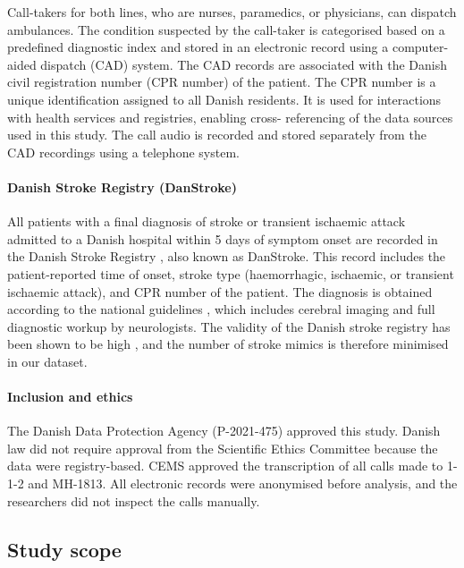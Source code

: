 {Call-takers for both lines, who are nurses, paramedics, or physicians, can dispatch ambulances. The condition suspected by the call-taker is categorised based on a predefined diagnostic index and stored in an electronic record using a computer-aided dispatch (CAD) system. The CAD records are associated with the Danish civil registration number (CPR number) \parencite{cite19} of the patient. The CPR number is a unique identification assigned to all Danish residents. It is used for interactions with health services and registries, enabling cross- referencing of the data sources used in this study. The call audio is recorded and stored separately from the CAD recordings using a telephone system.

\paragraph{Danish Stroke Registry (DanStroke)}

All patients with a final diagnosis of stroke or transient ischaemic attack admitted to a Danish hospital within 5 days of symptom onset are recorded in the Danish Stroke Registry \parencite{cite16}, also known as DanStroke. This record includes the patient-reported time of onset, stroke type (haemorrhagic, ischaemic, or transient ischaemic attack), and CPR number of the patient.
The diagnosis is obtained according to the national guidelines \parencite{baluenfeldt_national_2021}, which includes cerebral imaging and full diagnostic workup by neurologists. The validity of the Danish stroke registry has been shown to be high \parencite{wildenschild_registration_2013}, and the number of stroke mimics is therefore minimised in our dataset.


\paragraph{Inclusion and ethics}

The Danish Data Protection Agency (P-2021-475) approved this study. Danish law did not require approval from the Scientific Ethics Committee because the data were registry-based. CEMS approved the transcription of all calls made to 1-1-2 and MH-1813. All electronic records were anonymised before analysis, and the researchers did not inspect the calls manually.


\subsection{Study scope}

}
